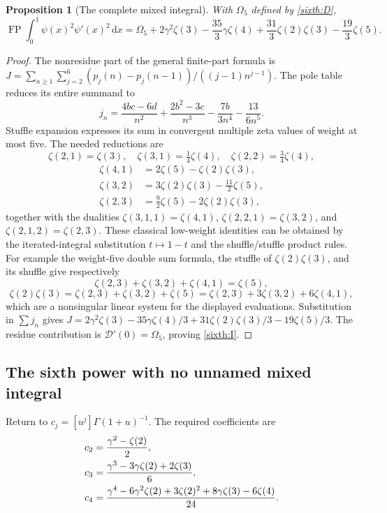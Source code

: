 \documentclass[11pt,a4paper]{article}
\numberwithin{equation}{section}
\newtheorem{proposition}[theorem]{Proposition}
\theoremstyle{definition}
\theoremstyle{remark}
\DeclareMathOperator{\FP}{FP}
\newcommand{\dd}{\,\mathrm d}
\begin{document}
\begin{proposition}[The complete mixed integral]
\label{sixth:mixed}
With $\Omega_5$ defined by \eqref{sixth:D},
\begin{equation}\label{sixth:I}
 \boxed{\displaystyle
 \FP\int_0^1\psi(x)^2\psi'(x)^2\dd x
 =\Omega_5+2\gamma^2\zeta(3)-\frac{35}{3}\gamma\zeta(4)
      +\frac{31}{3}\zeta(2)\zeta(3)-\frac{19}{3}\zeta(5).}
\end{equation}
\end{proposition}
\begin{proof}
The nonresidue part of the general finite-part formula is
$J=\sum_{n\ge1}\sum_{j=2}^6
       (p_j(n)-p_j(n-1))/((j-1)n^{j-1})$.
The pole table reduces its entire summand to
\[
 j_n=\frac{4bc-6d}{n^2}+\frac{2b^2-3c}{n^3}
             -\frac{7b}{3n^4}-\frac{13}{6n^5}.
\]
Stuffle expansion expresses its sum in convergent multiple zeta values
of weight at most five.  The needed reductions are
\[
 \zeta(2,1)=\zeta(3),\quad
 \zeta(3,1)=\tfrac14\zeta(4),\quad
 \zeta(2,2)=\tfrac34\zeta(4),
\]
\begin{align*}
 \zeta(4,1)&=2\zeta(5)-\zeta(2)\zeta(3),\\
 \zeta(3,2)&=3\zeta(2)\zeta(3)-\tfrac{11}{2}\zeta(5),\\
 \zeta(2,3)&=\tfrac92\zeta(5)-2\zeta(2)\zeta(3),
\end{align*}
together with the dualities
$\zeta(3,1,1)=\zeta(4,1)$,
$\zeta(2,2,1)=\zeta(3,2)$, and
$\zeta(2,1,2)=\zeta(2,3)$.
These classical low-weight identities can be obtained by the
iterated-integral substitution $t\mapsto1-t$ and the shuffle/stuffle
product rules.  For example the weight-five double sum formula,
the stuffle of $\zeta(2)\zeta(3)$, and its shuffle give respectively
\[
 \zeta(2,3)+\zeta(3,2)+\zeta(4,1)=\zeta(5),
\]
\[
 \zeta(2)\zeta(3)=\zeta(2,3)+\zeta(3,2)+\zeta(5)
                =\zeta(2,3)+3\zeta(3,2)+6\zeta(4,1),
\]
which are a nonsingular linear system for the displayed evaluations.
Substitution in $\sum j_n$ gives
$J=2\gamma^2\zeta(3)-35\gamma\zeta(4)/3
   +31\zeta(2)\zeta(3)/3-19\zeta(5)/3$.
The residue contribution is $\mathcal D'(0)=\Omega_5$, proving
\eqref{sixth:I}.
\end{proof}

\subsection{The sixth power with no unnamed mixed integral}

Return to $c_j=[u^j]\Gamma(1+u)^{-1}$.  The required coefficients are
\begin{align}
 c_2&=\frac{\gamma^2-\zeta(2)}2,\notag\\
 c_3&=\frac{\gamma^3-3\gamma\zeta(2)+2\zeta(3)}6,\label{sixth:cs}\\
 c_4&=\frac{\gamma^4-6\gamma^2\zeta(2)+3\zeta(2)^2
                     +8\gamma\zeta(3)-6\zeta(4)}{24}.\notag
\end{align}
\end{document}

